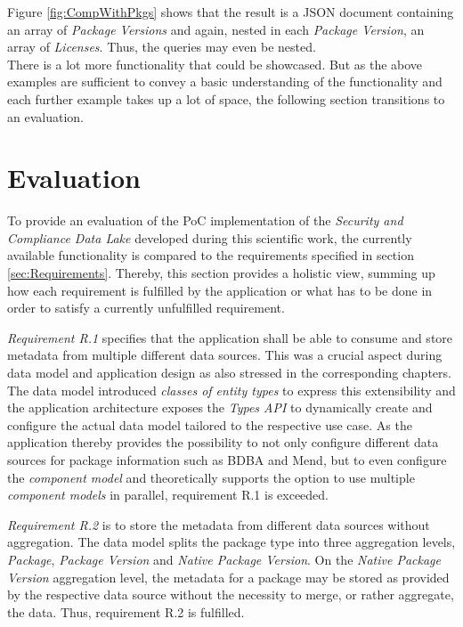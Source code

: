Figure \ref{fig:CompWithPkgs} shows that the result is a JSON document containing an array of \emph{Package Versions} and again, nested in each \emph{Package Version}, an array of \emph{Licenses}. Thus, the queries may even be nested.\\

There is a lot more functionality that could be showcased. But as the above examples are sufficient to convey a basic understanding of the functionality and each further example takes up a lot of space, the following section transitions to an evaluation. 

\section{Evaluation}
To provide an evaluation of the PoC implementation of the \emph{Security and Compliance Data Lake} developed during this scientific work, the currently available functionality is compared to the requirements specified in section \ref{sec:Requirements}. Thereby, this section provides a holistic view, summing up how each requirement is fulfilled by the application or what has to be done in order to satisfy a currently unfulfilled requirement.\par
\emph{Requirement R.1} specifies that the application shall be able to consume and store metadata from multiple different data sources. This was a crucial aspect during data model and application design as also stressed in the corresponding chapters. The data model introduced \emph{classes of entity types} to express this extensibility and the application architecture exposes the \emph{Types API} to dynamically create and configure the actual data model tailored to the respective use case. As the application thereby provides the possibility to not only configure different data sources for package information such as BDBA and Mend, but to even configure the \emph{component model} and theoretically supports the option to use multiple \emph{component models} in parallel, requirement R.1 is exceeded.\par
\emph{Requirement R.2} is to store the metadata from different data sources without aggregation. The data model splits the package type into three aggregation levels, \emph{Package}, \emph{Package Version} and \emph{Native Package Version}. On the \emph{Native Package Version} aggregation level, the metadata for a package may be stored as provided by the respective data source without the necessity to merge, or rather aggregate, the data. Thus, requirement R.2 is fulfilled.\par

